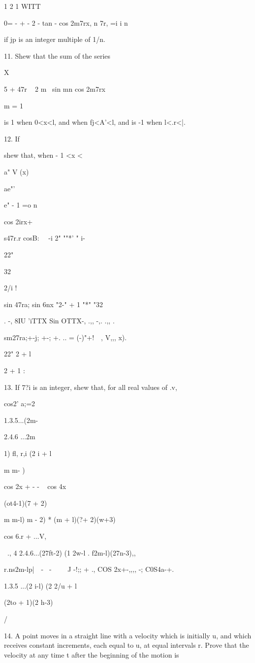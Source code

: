 1 2 1 WITT

0= - + - 2 - tan - cos 2m7rx, n 7r, =i i n

if jp is an integer multiple of 1/n. 

11. Shew that the sum of the series

X

 5 + 47r ~ 2 m~ sin mn cos 2m7rx

m = 1

is 1 when 0<x<l, and when fj<A'<l, and is -1 when l<.r<|.

12. If

shew that, when - 1 <x <\,

a" V (x)

ae"'

e" - 1 =o n

cos 2irx+

s47r.r cosB\pij: \ \ -i 2" ""*' " i-

22"

32

2/i !

sin 47ra; sin 6nx "2-" + 1 "*" "32

. -, 8IU 'iTTX Sin OTTX-, .,, -,. .,, .

sm27ra;+-j; +-; +. .. = (-)"+! \ \,, V,,, x).

22" 2 + l

2 + 1 :


13. If 7?i is an integer, shew that, for all real values of .v,

cos2' a;=2

1.3.5...(2m-

2.4.6 ...2m

1) fl, r,i (2 i + l

m m- )

cos 2x + - - ~ cos 4x

(ot4-1)(7 + 2)

m m-l) m - 2) * (m + l)(?\pi + 2)(w+3)

cos 6.r + ...V,

  \ ., 4 2.4.6...(27ft-2) (1 2w-l . f2m-l)(27n-3),,

r.ns2m-l\;p|\ \ - \ - \ \ \ \ J -!;; + ., COS 2x+-,,,, -;
C0S4a-+.

1.3.5 ...(2 i-l) (2 2/u + l

(2to + 1)(2 h-3)

/

14. A point moves in a straight line with a velocity which is
initially u, and which receives constant increments, each equal to u,
at equal intervals r. Prove that the velocity at any time t after the
beginning of the motion is

